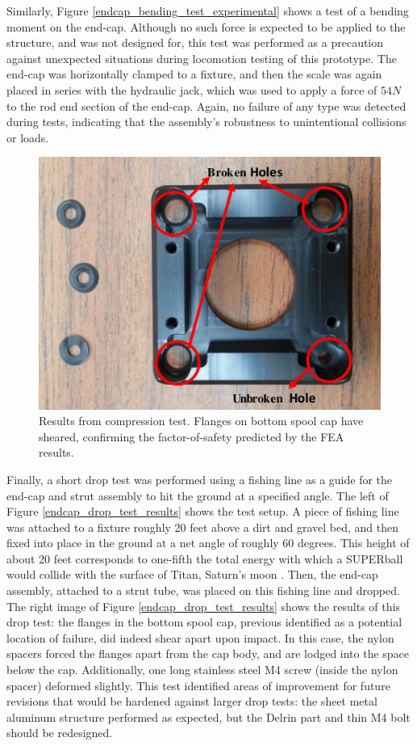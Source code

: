 \documentclass[12pt]{report}
\begin{document}
Similarly, Figure \ref{endcap_bending_test_experimental} shows a test of a bending moment on the end-cap.
Although no such force is expected to be applied to the structure, and was not designed for, this test was performed as a precaution against unexpected situations during locomotion testing of this prototype.
The end-cap was horizontally clamped to a fixture, and then the scale was again placed in series with the hydraulic jack, which was used to apply a force of $54 N$ to the rod end section of the end-cap.
Again, no failure of any type was detected during tests, indicating that the assembly's robustness to unintentional collisions or loads.

\begin{figure}
   \vspace{-0.5cm}
   \centering
   \includegraphics[width=0.40\columnwidth]{img/bottom_spool_cap_failure.jpg} 
   \caption{Results from compression test. Flanges on bottom spool cap have sheared, confirming the factor-of-safety predicted by the FEA results.}
   \label{broken_bottom_spool_cap}
   \vspace{-0.5cm}
\end{figure}

Finally, a short drop test was performed using a fishing line as a guide for the end-cap and strut assembly to hit the ground at a specified angle.
The left of Figure \ref{endcap_drop_test_results} shows the test setup.
A piece of fishing line was attached to a fixture roughly 20 feet above a dirt and gravel bed, and then fixed into place in the ground at a net angle of roughly 60 degrees.
This height of about 20 feet corresponds to one-fifth the total energy with which a SUPERball would collide with the surface of Titan, Saturn's moon \cite{Vytas_IPPW_2013}.
Then, the end-cap assembly, attached to a strut tube, was placed on this fishing line and dropped.
The right image of Figure \ref{endcap_drop_test_results} shows the results of this drop test: the flanges in the bottom spool cap, previous identified as a potential location of failure, did indeed shear apart upon impact.
In this case, the nylon spacers forced the flanges apart from the cap body, and are lodged into the space below the cap.
Additionally, one long stainless steel M4 screw (inside the nylon spacer) deformed slightly.
This test identified areas of improvement for future revisions that would be hardened against larger drop tests: the sheet metal aluminum structure performed as expected, but the Delrin part and thin M4 bolt should be redesigned.
\end{document}

